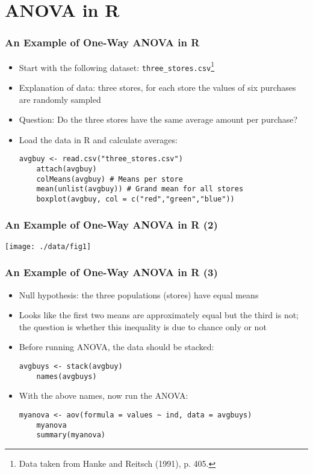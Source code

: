 \documentclass[10pt]{beamer}
\theoremstyle{definition}
\begin{document}
\section{ANOVA in R}
\begin{frame}[fragile]
\frametitle{An Example of One-Way ANOVA in R}
\begin{itemize}
	\item Start with the following dataset: \texttt{three\_stores.csv}\footnote{Data taken from Hanke and Reitsch (1991), p. 405.}
	\item Explanation of data: three stores, for each store the values of six purchases are randomly sampled
	\item Question: Do the three stores have the same average amount per purchase?
	\item Load the data in R and calculate averages:
	\begin{lstlisting}[style = rstyle, breaklines]
	avgbuy <- read.csv("three_stores.csv")
	attach(avgbuy)
	colMeans(avgbuy) # Means per store
	mean(unlist(avgbuy)) # Grand mean for all stores
	boxplot(avgbuy, col = c("red","green","blue"))
	\end{lstlisting}
\end{itemize}
\end{frame}

\begin{frame}[fragile]
\frametitle{An Example of One-Way ANOVA in R (2)}
\centerline{\texttt{[image: ./data/fig1]}}
\end{frame}


\begin{frame}[fragile]
\frametitle{An Example of One-Way ANOVA in R (3)}
\begin{itemize}
	\item Null hypothesis: the three populations (stores) have equal means
	\item Looks like the first two means are approximately equal but the third is not; the question is whether this inequality is due to chance only or not
	\item Before running ANOVA, the data should be stacked:
	\begin{lstlisting}[style = rstyle, breaklines]
	avgbuys <- stack(avgbuy)
	names(avgbuys)
	\end{lstlisting}
	\item With the above names, now run the ANOVA:
	\begin{lstlisting}[style = rstyle, breaklines]
	myanova <- aov(formula = values ~ ind, data = avgbuys)
	myanova
	summary(myanova)
	\end{lstlisting}
\end{itemize}
\end{frame}
\end{document}
